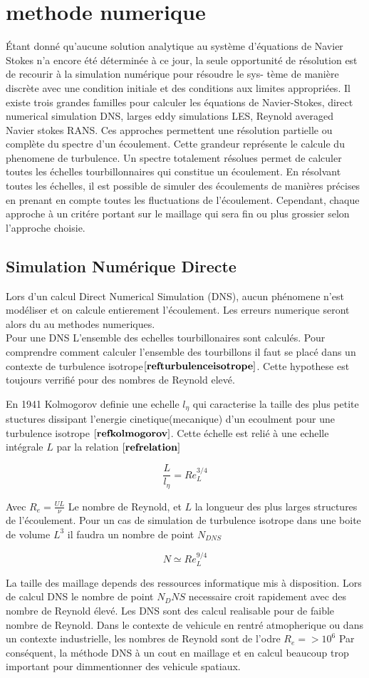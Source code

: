 \section{methode numerique}
Étant donné qu’aucune solution analytique au système d’équations de
Navier Stokes n’a encore été déterminée à ce jour, la seule opportunité de
résolution est de recourir à la simulation numérique pour résoudre le sys-
tème de manière discrète avec une condition initiale et des conditions aux
limites appropriées.
Il existe trois grandes familles pour calculer les équations de Navier-Stokes, direct numerical simulation DNS, larges eddy simulations LES, Reynold averaged Navier stokes RANS.
Ces approches permettent une résolution partielle ou complète du spectre d'un écoulement.
Cette grandeur représente le calcule du phenomene de turbulence. Un spectre totalement résolues permet de calculer toutes les échelles  tourbillonnaires qui constitue un écoulement.
En résolvant toutes les échelles, il est possible de simuler des écoulements de manières précises en prenant en compte toutes les fluctuations de l'écoulement.
Cependant, chaque approche à un critére portant sur le maillage qui sera fin ou plus grossier selon l'approche choisie.

\subsection{Simulation Numérique Directe}

Lors d'un calcul Direct Numerical Simulation (DNS), aucun phénomene n'est modéliser et on calcule entierement l'écoulement. Les erreurs numerique seront alors du au methodes numeriques.\\
Pour une DNS L'ensemble des echelles tourbillonaires sont calculés. Pour comprendre comment calculer l'ensemble des tourbillons il faut se placé dans un contexte de turbulence isotrope$\bf{[ref turbulence isotrope]}$. Cette hypothese est toujours verrifié pour des nombres de Reynold elevé.

En 1941 Kolmogorov definie une echelle $l_{\eta}$ qui caracterise la taille des plus petite stuctures dissipant l'energie cinetique(mecanique) d'un ecoulment pour une turbulence isotrope $\bf{[ref kolmogorov]}$.  Cette échelle est relié à une echelle intégrale $L$ par la relation $\bf{[ref relation]}$

$$
\frac{L}{l_{\eta}}=R e_{L}^{3 / 4}
$$

Avec $R_e=\frac{UL}{\nu}$ Le nombre de Reynold, et $L$ la longueur des plus larges structures de l'écoulement.
Pour un cas de simulation de turbulence isotrope dans une boite de volume  $L^3$ il faudra un nombre de point $N_{DNS}$

$$
N \simeq R e_{L}^{9 / 4}
$$

La taille des maillage depends des ressources informatique mis à disposition. Lors de calcul DNS le nombre de point $N_DNS $ necessaire croit rapidement avec des nombre de Reynold élevé. Les DNS sont des calcul realisable pour de faible nombre de Reynold. Dans le contexte de vehicule en rentré atmopherique ou dans un contexte industrielle, les nombres de Reynold sont de l'odre $R_e=>10^{6}$
Par conséquent, la méthode DNS à un cout en maillage et en calcul beaucoup trop important pour dimmentionner des vehicule spatiaux.
